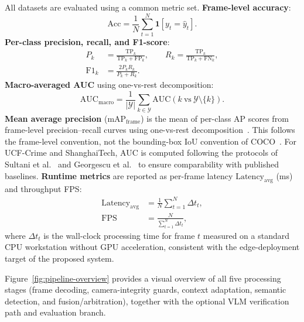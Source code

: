 \documentclass[a4paper,fleqn]{cas-dc}
\begin{document}
All datasets are evaluated using a common metric set. \textbf{Frame-level accuracy}:
\begin{equation}
\mathrm{Acc} = \frac{1}{N}\sum_{t=1}^{N}\mathbf{1}[y_t = \hat{y}_t].
\end{equation}
\textbf{Per-class precision, recall, and F1-score}:
\begin{equation}
\begin{aligned}
P_k &= \frac{\mathrm{TP}_k}{\mathrm{TP}_k + \mathrm{FP}_k}, \qquad
R_k = \frac{\mathrm{TP}_k}{\mathrm{TP}_k + \mathrm{FN}_k}, \\
\mathrm{F1}_k &= \frac{2P_kR_k}{P_k + R_k}.
\end{aligned}
\end{equation}
\textbf{Macro-averaged AUC} using one-vs-rest decomposition:
\begin{equation}
\mathrm{AUC}_{\text{macro}} = \frac{1}{|\mathcal{Y}|}\sum_{k \in \mathcal{Y}}\mathrm{AUC}(k\ \text{vs}\ \mathcal{Y}\setminus\{k\}).
\end{equation}
\textbf{Mean average precision} ($\mathrm{mAP}_{\mathrm{frame}}$) is the mean of per-class AP scores from frame-level precision--recall curves using one-vs-rest decomposition~\citep{manning2008introduction}. This follows the frame-level convention, not the bounding-box IoU convention of COCO~\citep{lin2014microsoft}. For UCF-Crime and ShanghaiTech, AUC is computed following the protocols of Sultani et al.~\citep{sultani2018realworld} and Georgescu et al.~\citep{georgescu2021anomaly} to ensure comparability with published baselines. \textbf{Runtime metrics} are reported as per-frame latency $\mathrm{Latency}_{\text{avg}}$ (ms) and throughput FPS:
\begin{equation}
\begin{aligned}
\mathrm{Latency}_{\text{avg}} &= \frac{1}{N}\sum_{t=1}^{N}\Delta t_t, \\[4pt]
\mathrm{FPS} &= \frac{N}{\sum_{t=1}^{N}\Delta t_t},
\end{aligned}
\end{equation}
where $\Delta t_t$ is the wall-clock processing time for frame $t$ measured on a standard CPU workstation without GPU acceleration, consistent with the edge-deployment target of the proposed system.
 
Figure~\ref{fig:pipeline-overview} provides a visual overview of all five processing stages (frame decoding, camera-integrity guards, context adaptation, semantic detection, and fusion/arbitration), together with the optional VLM verification path and evaluation branch.
 
\end{document}
